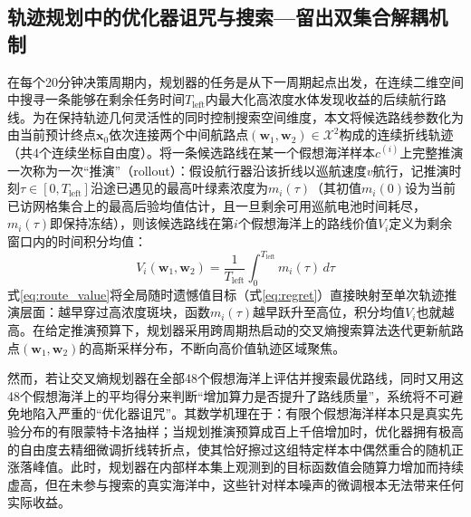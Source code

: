 \subsection{轨迹规划中的优化器诅咒与搜索—留出双集合解耦机制}

在每个20分钟决策周期内，规划器的任务是从下一周期起点出发，在连续二维空间中搜寻一条能够在剩余任务时间$T_{\text{left}}$内最大化高浓度水体发现收益的后续航行路线。为在保持轨迹几何灵活性的同时控制搜索空间维度，本文将候选路线参数化为由当前预计终点$\mathbf{x}_0$依次连接两个中间航路点$(\mathbf{w}_1, \mathbf{w}_2)\in\mathcal{X}^2$构成的连续折线轨迹（共4个连续坐标自由度）。将一条候选路线在某一个假想海洋样本$c^{(i)}$上完整推演一次称为一次“推演”（rollout）：假设航行器沿该折线以巡航速度$v$航行，记推演时刻$\tau\in[0, T_{\text{left}}]$沿途已遇见的最高叶绿素浓度为$m_i(\tau)$（其初值$m_i(0)$设为当前已访网格集合上的最高后验均值估计，且一旦剩余可用巡航电池时间耗尽，$m_i(\tau)$即保持冻结），则该候选路线在第$i$个假想海洋上的路线价值$V_i$定义为剩余窗口内的时间积分均值：
\begin{equation}
  V_i(\mathbf{w}_1, \mathbf{w}_2) = \frac{1}{T_{\text{left}}}\int_0^{T_{\text{left}}} m_i(\tau)\, d\tau
  \label{eq:route_value}
\end{equation}
式\eqref{eq:route_value}将全局随时遗憾值目标（式\eqref{eq:regret}）直接映射至单次轨迹推演层面：越早穿过高浓度斑块，函数$m_i(\tau)$越早跃升至高位，积分均值$V_i$也就越高。在给定推演预算下，规划器采用跨周期热启动的交叉熵搜索算法\cite{deboer2005cem}迭代更新航路点$(\mathbf{w}_1, \mathbf{w}_2)$的高斯采样分布，不断向高价值轨迹区域聚焦。

然而，若让交叉熵规划器在全部48个假想海洋上评估并搜索最优路线，同时又用这48个假想海洋上的平均得分来判断“增加算力是否提升了路线质量”，系统将不可避免地陷入严重的“优化器诅咒”\cite{smith2006curse, vanhasselt2010double}。其数学机理在于：有限个假想海洋样本只是真实先验分布的有限蒙特卡洛抽样；当规划推演预算成百上千倍增加时，优化器拥有极高的自由度去精细微调折线转折点，使其恰好擦过这组特定样本中偶然重合的随机正涨落峰值。此时，规划器在内部样本集上观测到的目标函数值会随算力增加而持续虚高，但在未参与搜索的真实海洋中，这些针对样本噪声的微调根本无法带来任何实际收益。

